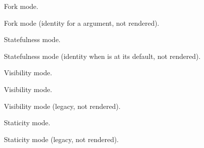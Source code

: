 \label{Oxcaml--val-mode_unforkable}\begin{ocamlindent}Fork mode.\end{ocamlindent}%
\medbreak
\label{Oxcaml--val-mode_local_unforkable}\begin{ocamlindent}Fork mode (identity for a  argument, not rendered).\end{ocamlindent}%
\medbreak
\label{Oxcaml--val-mode_stateless}\begin{ocamlindent}Statefulness mode.\end{ocamlindent}%
\medbreak
\label{Oxcaml--val-mode_stateful}\begin{ocamlindent}Statefulness mode (identity when  is at its default, not rendered).\end{ocamlindent}%
\medbreak
\label{Oxcaml--val-mode_immutable}\begin{ocamlindent}Visibility mode.\end{ocamlindent}%
\medbreak
\label{Oxcaml--val-mode_read}\begin{ocamlindent}Visibility mode.\end{ocamlindent}%
\medbreak
\label{Oxcaml--val-mode_read_write}\begin{ocamlindent}Visibility mode (legacy, not rendered).\end{ocamlindent}%
\medbreak
\label{Oxcaml--val-mode_static}\begin{ocamlindent}Staticity mode.\end{ocamlindent}%
\medbreak
\label{Oxcaml--val-mode_dynamic}\begin{ocamlindent}Staticity mode (legacy, not rendered).\end{ocamlindent}%
\medbreak
